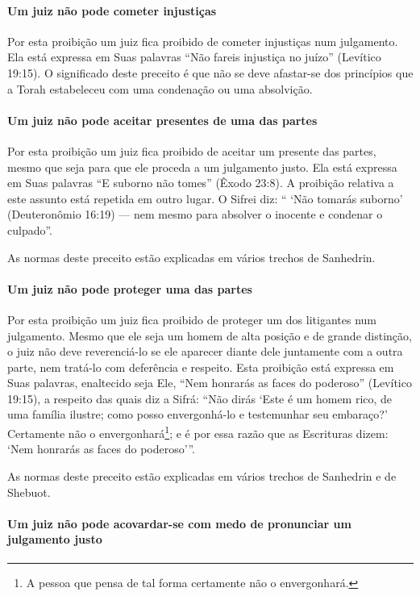\paragraph{Um juiz não pode cometer injustiças}

Por esta proibição um juiz fica proibido de cometer injustiças num
julgamento. Ela está expressa em Suas palavras ``Não fareis injustiça no
juízo'' (Levítico 19:15). O significado deste preceito é que não se deve
afastar-se dos princípios que a Torah estabeleceu com uma condenação ou
uma absolvição.

\paragraph{Um juiz não pode aceitar presentes de uma das partes}

Por esta proibição um juiz fica proibido de aceitar um presente das
partes, mesmo que seja para que ele proceda a um julgamento justo. Ela
está expressa em Suas palavras ``E suborno não tomes'' (Êxodo 23:8). A
proibição relativa a este assunto está repetida em outro lugar. O Sifrei
diz: `` `Não tomarás suborno' (Deuteronômio 16:19) --- nem mesmo para
absolver o inocente e condenar o culpado''.

As normas deste preceito estão explicadas em vários trechos de Sanhedrin.

\paragraph{Um juiz não pode proteger uma das partes}

Por esta proibição um juiz fica proibido de proteger um dos litigantes
num julgamento. Mesmo que ele seja um homem de alta posição e de grande
distinção, o juiz não deve reverenciá-lo se ele aparecer diante dele
juntamente com a outra parte, nem tratá-lo com deferência e respeito.
Esta proibição está expressa em Suas palavras, enaltecido seja Ele,
``Nem honrarás as faces do poderoso'' (Levítico 19:15), a respeito das
quais diz a Sifrá: ``Não dirás `Este é um homem rico, de uma família
ilustre; como posso envergonhá-lo e testemunhar seu embaraço?'
Certamente não o envergonhará\footnote{A pessoa que pensa de tal forma certamente não o envergonhará.}; e é por essa razão
que as Escrituras dizem: `Nem honrarás as faces do poderoso'''.

As normas deste preceito estão explicadas em vários trechos de Sanhedrin e de Shebuot.

\paragraph{Um juiz não pode acovardar-se com medo de pronunciar um julgamento justo}

